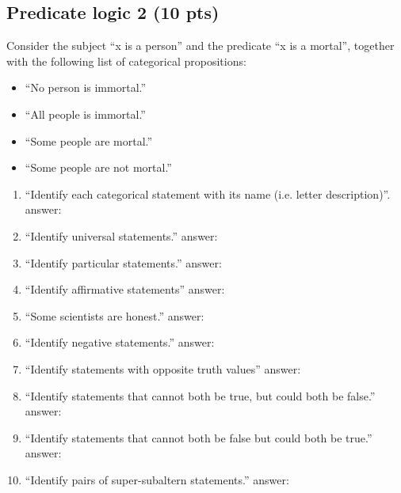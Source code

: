 \documentclass[12pt]{article}
\begin{document}
\newpage

\subsection{Predicate logic 2 (10 pts)}

\noindent Consider the subject ``x is a person'' and the predicate ``x is a mortal'', together with the following list of categorical propositions:
\begin{itemize}
\item ``No person is immortal.''

\item ``All people is immortal.''

\item ``Some people are mortal.''	

\item ``Some people are not mortal.''	
\end{itemize} 


\begin{enumerate}
\item  ``Identify each categorical statement with its name (i.e. letter description)''.
\subitem answer: 

\item ``Identify universal statements.''
\subitem answer:  

\item ``Identify particular statements.''
\subitem answer:  

\item ``Identify affirmative statements''
\subitem answer: 

\item ``Some scientists are honest.''
\subitem answer:

\item ``Identify negative statements.''
\subitem answer: 

\item ``Identify statements with opposite truth values''
\subitem answer:  

\item ``Identify statements that cannot both be true, but could both be false.''
\subitem answer:  

\item ``Identify statements that cannot both be false but could both be true.''
\subitem answer:  

\item ``Identify pairs of super-subaltern statements.''
\subitem answer:  

\end{enumerate}
\end{document}
